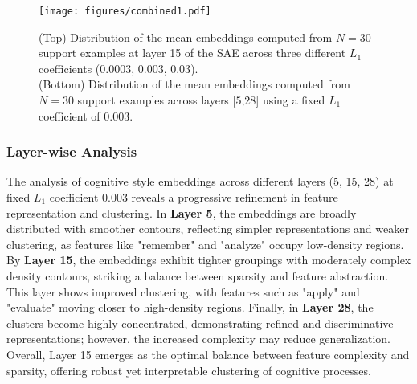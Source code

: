 {\begin{figure*}[h!]
  \texttt{[image: figures/combined1.pdf]}
  \caption{
(Top) Distribution of the mean embeddings computed from $N=30$ support examples at layer 15 of the SAE across three different $L_{1}$ coefficients ($0.0003$, $0.003$, $0.03$).\\[1mm]
(Bottom) Distribution of the mean embeddings computed from $N=30$ support examples across layers [$5$,$28$] using a fixed $L_{1}$ coefficient of $0.003$.
}

  \label{fig:combined_analysis}
\end{figure*}


\subsubsection{Layer-wise Analysis}
The analysis of cognitive style embeddings across different layers (5, 15, 28) at fixed $L_{1}$ coefficient 0.003 reveals a progressive refinement in feature representation and clustering. In \textbf{Layer 5}, the embeddings are broadly distributed with smoother contours, reflecting simpler representations and weaker clustering, as features like "remember" and "analyze" occupy low-density regions. By \textbf{Layer 15}, the embeddings exhibit tighter groupings with moderately complex density contours, striking a balance between sparsity and feature abstraction. This layer shows improved clustering, with features such as "apply" and "evaluate" moving closer to high-density regions. Finally, in \textbf{Layer 28}, the clusters become highly concentrated, demonstrating refined and discriminative representations; however, the increased complexity may reduce generalization. Overall, Layer 15 emerges as the optimal balance between feature complexity and sparsity, offering robust yet interpretable clustering of cognitive processes.


}
\clearpage
